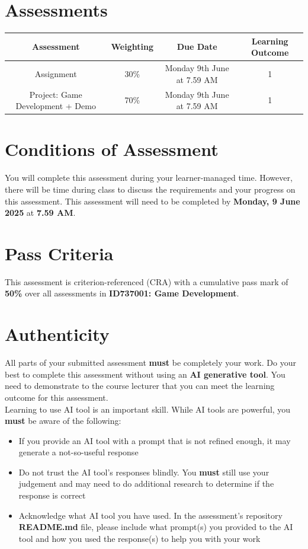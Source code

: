 \documentclass{article}
\begin{document}
\section*{Assessments}
\renewcommand{\arraystretch}{1.5}
\begin{tabular}{|c|c|c|c|}
	\hline
	\textbf{Assessment}                                 & \textbf{Weighting} & \textbf{Due Date}            & \textbf{Learning Outcome} \\ \hline
	\small Assignment                 & \small 30\%        & \small Monday 9th June at 7.59 AM \small  & \small 1                   \\ \hline
	\small Project: Game Development + Demo                 & \small 70\%        & \small Monday 9th June at 7.59 AM \small  & \small 1                   \\ \hline
\end{tabular}

\section*{Conditions of Assessment}
You will complete this assessment during your learner-managed time. However, there will be time during class to discuss the requirements and your progress on this assessment. This assessment will need to be completed by \textbf{Monday, 9 June 2025} at \textbf{7.59 AM}. 

\section*{Pass Criteria}
This assessment is criterion-referenced (CRA) with a cumulative pass mark of \textbf{50\%} over all assessments in \textbf{ID737001: Game Development}.

\section*{Authenticity}
All parts of your submitted assessment \textbf{must} be completely your work. Do your best to complete this assessment without using an \textbf{AI generative tool}. You need to demonstrate to the course lecturer that you can meet the learning outcome for this assessment. \\
 
Learning to use AI tool is an important skill. While AI tools are powerful, you \textbf{must} be aware of the following:

\begin{itemize}
    \item If you provide an AI tool with a prompt that is not refined enough, it may generate a not-so-useful response
    \item Do not trust the AI tool's responses blindly. You \textbf{must} still use your judgement and may need to do additional research to determine if the response is correct
    \item Acknowledge what AI tool you have used. In the assessment's repository \textbf{README.md} file, please include what prompt(s) you provided to the AI tool and how you used the response(s) to help you with your work
\end{itemize}
\end{document}
